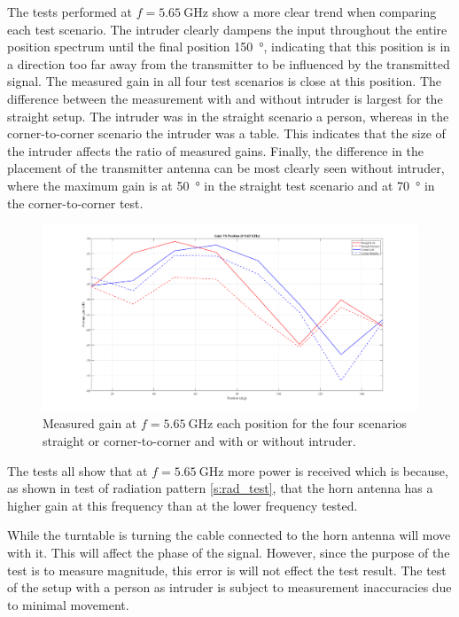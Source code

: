 The tests performed at $f=\SI{5.65}{\giga\hertz}$ show a more clear trend when comparing each test scenario. The intruder clearly dampens the input throughout the entire position spectrum until the final position \SI{150}{\degree}, indicating that this position is in a direction too far away from the transmitter to be influenced by the transmitted signal. The measured gain in all four test scenarios is close at this position. The difference between the measurement with and without intruder is largest for the straight setup. The intruder was in the straight scenario a person, whereas in the corner-to-corner scenario the intruder was a table. This indicates that the size of the intruder affects the ratio of measured gains. Finally, the difference in the placement of the transmitter antenna can be most clearly seen without intruder, where the maximum gain is at \SI{50}{\degree} in the straight test scenario and at \SI{70}{\degree} in the corner-to-corner test. 

\begin{figure}[H]
    \centering
    \includegraphics[width=1\textwidth]{figures/gain_vs_pos_565.png}
    \caption{Measured gain at $f=\SI{5.65}{\giga\hertz}$ each position for the four scenarios straight or corner-to-corner and with or without intruder.} 
    \label{fig:gain_vs_pos_565}
\end{figure}

The tests all show that at $f=\SI{5.65}{\giga\hertz}$ more power is received which is because, as shown in test of radiation pattern \ref{s:rad_test}, that the horn antenna has a higher gain at this frequency than at the lower frequency tested. 

While the turntable is turning the cable connected to the horn antenna will move with it. This will affect the phase of the signal. However, since the purpose of the test is to measure magnitude, this error is will not effect the test result. The test of the setup with a person as intruder is subject to measurement inaccuracies due to minimal movement.